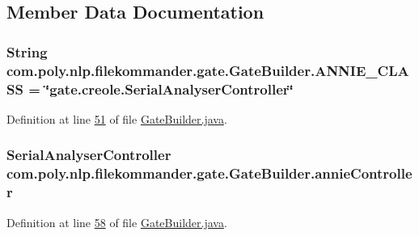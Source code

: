 \subsection{Member Data Documentation}
\hypertarget{classcom_1_1poly_1_1nlp_1_1filekommander_1_1gate_1_1_gate_builder_a39a6c089a884f6318ae963e21b8fc3bf}{
\subsubsection[{A\-N\-N\-I\-E\-\_\-\-C\-L\-A\-S\-S}]{\setlength{\rightskip}{0pt plus 5cm}String com.\-poly.\-nlp.\-filekommander.\-gate.\-Gate\-Builder.\-A\-N\-N\-I\-E\-\_\-\-C\-L\-A\-S\-S = \char`\"{}gate.\-creole.\-Serial\-Analyser\-Controller\char`\"{}\hspace{0.3cm}{\ttfamily [private]}}}\label{classcom_1_1poly_1_1nlp_1_1filekommander_1_1gate_1_1_gate_builder_a39a6c089a884f6318ae963e21b8fc3bf}


Definition at line \hyperlink{L51}{51} of file \hyperlink{}{Gate\-Builder.\-java}.

\hypertarget{classcom_1_1poly_1_1nlp_1_1filekommander_1_1gate_1_1_gate_builder_a3801bc53fd7b7449a0aa714ad21bebea}{
\subsubsection[{annie\-Controller}]{\setlength{\rightskip}{0pt plus 5cm}Serial\-Analyser\-Controller com.\-poly.\-nlp.\-filekommander.\-gate.\-Gate\-Builder.\-annie\-Controller\hspace{0.3cm}{\ttfamily [private]}}}\label{classcom_1_1poly_1_1nlp_1_1filekommander_1_1gate_1_1_gate_builder_a3801bc53fd7b7449a0aa714ad21bebea}


Definition at line \hyperlink{L58}{58} of file \hyperlink{}{Gate\-Builder.\-java}.

